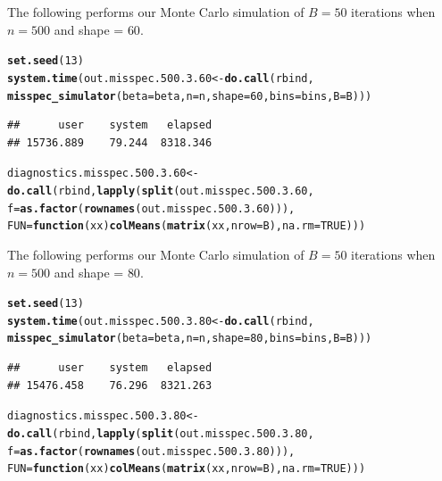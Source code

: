 \documentclass[11pt]{article}\usepackage[]{graphicx}\usepackage[]{color}
\makeatletter
\newcommand{\hlnum}[1]{\textcolor[rgb]{0.686,0.059,0.569}{#1}}%
\newcommand{\hlstd}[1]{\textcolor[rgb]{0.345,0.345,0.345}{#1}}%
\newcommand{\hlkwa}[1]{\textcolor[rgb]{0.161,0.373,0.58}{\textbf{#1}}}%
\newcommand{\hlkwb}[1]{\textcolor[rgb]{0.69,0.353,0.396}{#1}}%
\newcommand{\hlkwc}[1]{\textcolor[rgb]{0.333,0.667,0.333}{#1}}%
\newcommand{\hlkwd}[1]{\textcolor[rgb]{0.737,0.353,0.396}{\textbf{#1}}}%
\newenvironment{kframe}{%
 \def\at@end@of@kframe{}%
 \ifinner\ifhmode%
  \def\at@end@of@kframe{\end{minipage}}%
  \begin{minipage}{\columnwidth}%
 \fi\fi%
 \def\FrameCommand##1{\hskip\@totalleftmargin \hskip-\fboxsep
 \colorbox{shadecolor}{##1}\hskip-\fboxsep
     \hskip-\linewidth \hskip-\@totalleftmargin \hskip\columnwidth}%
 \MakeFramed {\advance\hsize-\width
   \@totalleftmargin\z@ \linewidth\hsize
   \@setminipage}}%
 {\par\unskip\endMakeFramed%
 \at@end@of@kframe}
\newenvironment{knitrout}{}{} %
\makeatother
\begin{document}
The following performs our Monte Carlo simulation of $B = 50$ iterations 
when $n = 500$ and shape = $60$.

\begin{knitrout}
\color{fgcolor}\begin{kframe}
\begin{alltt}
\hlkwd{set.seed}\hlstd{(}\hlnum{13}\hlstd{)}
\hlkwd{system.time}\hlstd{(out.misspec.500.3.60} \hlkwb{<-} \hlkwd{do.call}\hlstd{(rbind,}
  \hlkwd{misspec_simulator}\hlstd{(}\hlkwc{beta} \hlstd{= beta,} \hlkwc{n} \hlstd{= n,} \hlkwc{shape} \hlstd{=} \hlnum{60}\hlstd{,} \hlkwc{bins} \hlstd{= bins,} \hlkwc{B} \hlstd{= B)))}
\end{alltt}
\begin{verbatim}
##      user    system   elapsed 
## 15736.889    79.244  8318.346
\end{verbatim}
\begin{alltt}
\hlstd{diagnostics.misspec.500.3.60} \hlkwb{<-} \hlkwd{do.call}\hlstd{(rbind,} \hlkwd{lapply}\hlstd{(}\hlkwd{split}\hlstd{(out.misspec.500.3.60,}
  \hlkwc{f} \hlstd{=} \hlkwd{as.factor}\hlstd{(}\hlkwd{rownames}\hlstd{(out.misspec.500.3.60))),}
  \hlkwc{FUN} \hlstd{=} \hlkwa{function}\hlstd{(}\hlkwc{xx}\hlstd{)} \hlkwd{colMeans}\hlstd{(}\hlkwd{matrix}\hlstd{(xx,} \hlkwc{nrow} \hlstd{= B),} \hlkwc{na.rm} \hlstd{=} \hlnum{TRUE}\hlstd{)))}
\end{alltt}
\end{kframe}
\end{knitrout}


The following performs our Monte Carlo simulation of $B = 50$ iterations 
when $n = 500$ and shape = $80$.

\begin{knitrout}
\color{fgcolor}\begin{kframe}
\begin{alltt}
\hlkwd{set.seed}\hlstd{(}\hlnum{13}\hlstd{)}
\hlkwd{system.time}\hlstd{(out.misspec.500.3.80} \hlkwb{<-} \hlkwd{do.call}\hlstd{(rbind,}
  \hlkwd{misspec_simulator}\hlstd{(}\hlkwc{beta} \hlstd{= beta,} \hlkwc{n} \hlstd{= n,} \hlkwc{shape} \hlstd{=} \hlnum{80}\hlstd{,} \hlkwc{bins} \hlstd{= bins,} \hlkwc{B} \hlstd{= B)))}
\end{alltt}
\begin{verbatim}
##      user    system   elapsed 
## 15476.458    76.296  8321.263
\end{verbatim}
\begin{alltt}
\hlstd{diagnostics.misspec.500.3.80} \hlkwb{<-} \hlkwd{do.call}\hlstd{(rbind,} \hlkwd{lapply}\hlstd{(}\hlkwd{split}\hlstd{(out.misspec.500.3.80,}
  \hlkwc{f} \hlstd{=} \hlkwd{as.factor}\hlstd{(}\hlkwd{rownames}\hlstd{(out.misspec.500.3.80))),}
  \hlkwc{FUN} \hlstd{=} \hlkwa{function}\hlstd{(}\hlkwc{xx}\hlstd{)} \hlkwd{colMeans}\hlstd{(}\hlkwd{matrix}\hlstd{(xx,} \hlkwc{nrow} \hlstd{= B),} \hlkwc{na.rm} \hlstd{=} \hlnum{TRUE}\hlstd{)))}
\end{alltt}
\end{kframe}
\end{knitrout}
\end{document}
